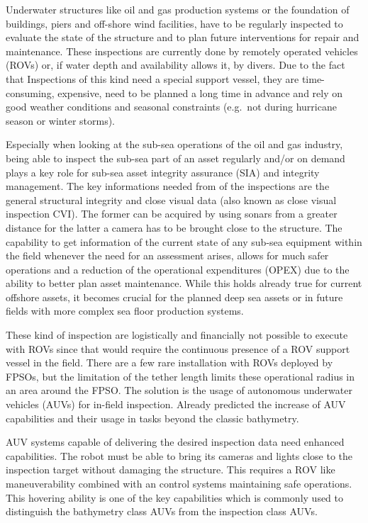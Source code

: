 \documentclass[conference]{IEEEtran}
\begin{document}
Underwater structures like oil and gas production systems or the foundation of buildings,
piers and off-shore wind facilities, have to be regularly inspected to evaluate the state
of the structure and to plan future interventions for repair and maintenance. These
inspections are currently done by remotely operated vehicles (ROVs) or, if water depth and
availability allows it, by divers. Due to the fact that Inspections of this kind need a
special support vessel, they are time-consuming, expensive, need to be planned a long time
in advance and rely on good weather conditions and seasonal constraints (e.g.~not during
hurricane season or winter storms).

Especially when looking at the sub-sea operations of the oil and gas industry, being able
to inspect the sub-sea part of an asset regularly and/or on demand plays a key role for
sub-sea asset integrity assurance (SIA) and integrity management. The key informations
needed from of the inspections are the general structural integrity and close visual data
(also known as close visual inspection CVI). The former can be acquired by using sonars
from a greater distance for the latter a camera has to be brought close to the structure.
The capability to get information of the current state of any sub-sea equipment within the
field whenever the need for an assessment arises, allows for much safer operations and a
reduction of the operational expenditures (OPEX) due to the ability to better plan asset
maintenance. While this holds already true for current offshore assets, it becomes crucial
for the planned deep sea assets or in future fields with more complex sea floor production
systems.

These kind of inspection are logistically and financially not possible to execute with
ROVs since that would require the continuous presence of a ROV support vessel in the
field. There are a few rare installation with ROVs deployed by FPSOs, but the limitation
of the tether length limits these operational radius in an area around the FPSO. The
solution is the usage of autonomous underwater vehicles (AUVs) for in-field inspection.
Already \cite{gamechanger07} predicted the increase of AUV capabilities and their usage in
tasks beyond the classic bathymetry.

AUV systems capable of delivering the desired inspection data need enhanced capabilities.
The robot must be able to bring its cameras and lights close to the inspection target
without damaging the structure. This requires a ROV like maneuverability combined with an
control systems maintaining safe operations. This hovering ability is one of the key
capabilities which is commonly used to distinguish the bathymetry class AUVs from the
inspection class AUVs.
\end{document}
